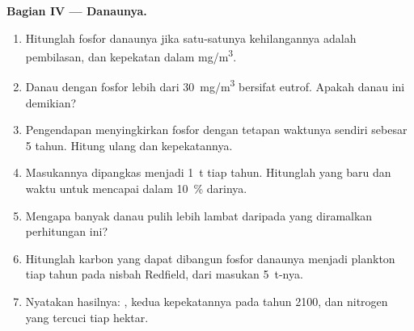 \begin{problem}
\medskip
\noindent\textbf{Bagian IV --- Danaunya.}
\begin{enumerate}[resume]
  \item Hitunglah  fosfor danaunya jika satu-satunya
        kehilangannya adalah pembilasan, dan kepekatan  dalam \unit{mg/m^3}.
  \item Danau dengan fosfor lebih dari \qty{30}{mg/m^3} bersifat
        eutrof. Apakah danau ini demikian?
  \item Pengendapan menyingkirkan fosfor dengan tetapan waktunya
        sendiri sebesar 5 tahun. Hitung ulang  dan
        kepekatannya.
  \item Masukannya dipangkas menjadi \qty{1}{t} tiap tahun. Hitunglah
         yang baru dan waktu untuk mencapai dalam
        \qty{10}{\%} darinya.
  \item Mengapa banyak danau pulih lebih lambat daripada yang
        diramalkan perhitungan ini?
  \item Hitunglah karbon yang dapat dibangun fosfor danaunya menjadi
        plankton tiap tahun pada nisbah Redfield, dari masukan
        \qty{5}{t}-nya.
  \item Nyatakan hasilnya: , kedua kepekatannya
        pada tahun 2100, dan nitrogen yang tercuci tiap hektar.
\end{enumerate}
\end{problem}
